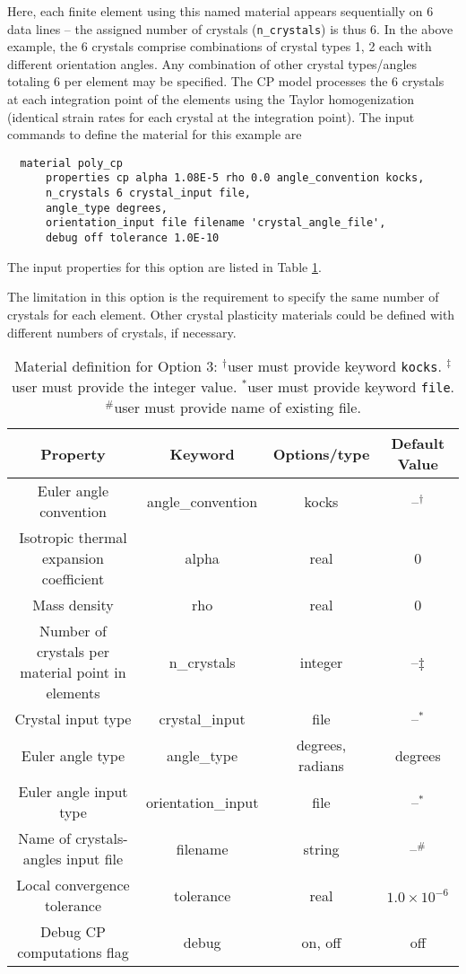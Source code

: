 \documentclass[11pt]{report}
\numberwithin{equation}{section}
\newcommand{\ttt} {\texttt}  %
\newcommand{\noi}{\noindent}
\begin{document}
\noi Here, each finite element using this named material 
appears sequentially on 6 data lines -- the
assigned number of crystals  (\ttt{n\_crystals}) is thus 6. In the above example,
the 6 crystals comprise combinations of crystal types 1, 2 each with
different orientation angles. Any combination of other crystal types/angles
totaling 6 per element may be specified. The CP model processes the 6
crystals at each integration point of the elements using the Taylor
homogenization (identical strain rates for each crystal at the integration point).
The input commands to define the material for this example are

\small
\begin{verbatim}
  material poly_cp
      properties cp alpha 1.08E-5 rho 0.0 angle_convention kocks,
      n_crystals 6 crystal_input file,
      angle_type degrees,
      orientation_input file filename 'crystal_angle_file',
      debug off tolerance 1.0E-10
\end{verbatim}
\normalsize

\noi  The input properties for this option are listed
in Table \ref{tab:mat-props-option3}.

The limitation in this option is the requirement to specify the same number of crystals
for each element.
Other crystal plasticity materials could be defined with different numbers of crystals, if necessary.

\begin{table}[htb]
\small
\centering
\setlength{\extrarowheight}{3pt}
\begin{tabular}{|c|c|c|c|}
\hline 
Property & Keyword & Options/type&Default Value\tabularnewline
\hline \hline
Euler angle convention & angle\_convention & kocks& --$^\dag$\tabularnewline \hline
Isotropic thermal expansion coefficient & alpha & real&0\tabularnewline \hline
Mass density & rho & real&0\tabularnewline \hline
Number of crystals per material point  in elements& n\_crystals & integer&--$\ddag$\tabularnewline \hline
Crystal input type & crystal\_input & file&--$^*$\tabularnewline \hline
Euler angle type & angle\_type & degrees, radians&degrees\tabularnewline \hline
Euler angle input type & orientation\_input &  file&--$^*$\tabularnewline \hline
Name of crystals-angles input file  & filename & string&--$^\#$\tabularnewline\hline
Local convergence tolerance & tolerance & real&$1.0\times 10^{-6}$\tabularnewline \hline
Debug CP computations flag & debug & on, off&off\tabularnewline
\hline 
\end{tabular}
\caption{Material definition for Option 3: $^\dag$user must provide keyword \ttt{kocks}.
$^\ddag$user must provide the integer value. $^{*}$user must provide keyword \ttt{file}. 
$^\#$user must provide name of existing file. 
\label{tab:mat-props-option3}}
\normalsize
\end{table}
\end{document}
